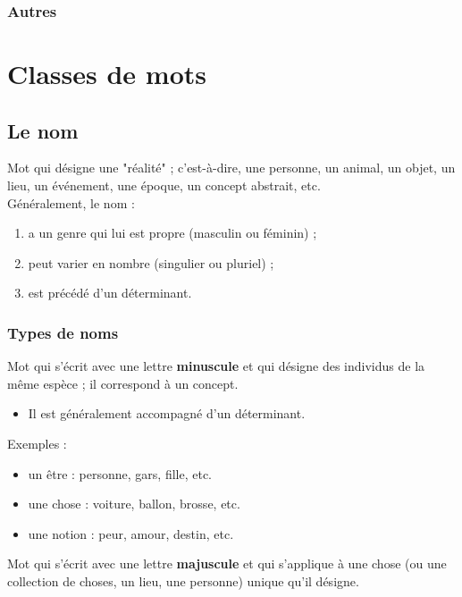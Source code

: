 \documentclass[10pt, french]{article}
\begin{document}
\begin{multicols*}{2}
\subsubsection{Autres}

\begin{definitionNOHFILLprop}

\end{definitionNOHFILLprop}




\newpage
\section{Classes de mots}
\subsection{Le nom}
\begin{definitionNOHFILL}[Le nom]
Mot qui désigne une "réalité" ; c'est-à-dire, une personne, un animal, un objet, un lieu, un événement, une époque, un concept abstrait, etc.	\\

Généralement, le nom : 
\begin{enumerate}
	\item	a un genre qui lui est propre (masculin ou féminin) ;
	\item	peut varier en nombre (singulier ou pluriel) ;
	\item	est précédé d'un déterminant.
\end{enumerate}
\end{definitionNOHFILL}

\subsubsection*{Types de noms}
\begin{definitionNOHFILLsub}
Mot qui s'écrit avec une lettre \textbf{minuscule} et qui désigne des individus de la même espèce ; il correspond à un concept.

\begin{itemize}
	\item	Il est généralement accompagné d'un déterminant.
\end{itemize}

\tcbline

Exemples :
\begin{itemize}
	\item	un être : personne, gars, fille, etc.
	\item	une chose : voiture, ballon, brosse, etc.
	\item	une notion : peur, amour, destin, etc.
\end{itemize}
\end{definitionNOHFILLsub}
\begin{definitionNOHFILLsub}
Mot qui s'écrit avec une lettre \textbf{majuscule} et qui s'applique à une chose (ou une collection de choses, un lieu, une personne) unique qu'il désigne.


\end{definitionNOHFILLsub}
\end{multicols*}
\end{document}
